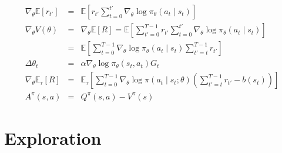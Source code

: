 \documentclass[]{article}
\begin{document}
\begin{eqnarray}
    \nabla_\theta \mathbb{E} [r_{t'}] &=& \mathbb{E} \left[r_{t'} \sum_{t=0}^{t'} \nabla_\theta \log \pi_\theta (a_t \mid s_t)\right]\\
    \nabla_\theta V(\theta) &=& \nabla_\theta \mathbb{E}[R] = \mathbb{E} \left[ \sum_{t'=0}^{T-1} r_{t'} \sum^{t'}_{t=0} \nabla_\theta \log \pi_\theta (a_t \mid s_t)  \right]\\
    &=& \mathbb{E} \left[ \sum_{t=0}^{T-1}  \nabla_\theta \log \pi_\theta (a_t \mid s_t)   \sum^{T-1}_{t'=t} r_{t'}  \right]\\
    \Delta \theta_t &=& \alpha \nabla_\theta \log \pi_\theta (s_t, a_t) G_t\\
    \nabla_\theta \mathbb{E}_\tau [R] &=& \mathbb{E}_\tau \left[ \sum_{t=0}^{T-1} \nabla_\theta \log \pi(a_t \mid s_t; \theta) \left( \sum_{t'=t}^{T-1} r_{t'} - b(s_t) \right) \right]\\
    A^\pi(s,a) &=& Q^\pi(s,a) - V^\pi(s) 
\end{eqnarray}

\section{Exploration}
\end{document}
